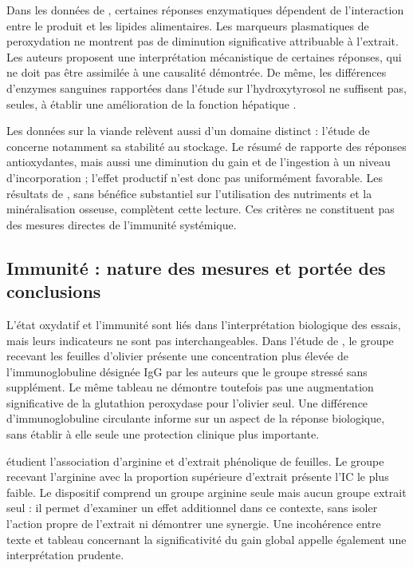 Dans les données de \citet{Sevillano2026}, certaines réponses enzymatiques dépendent de l'interaction entre le produit et les lipides alimentaires. Les marqueurs plasmatiques de peroxydation ne montrent pas de diminution significative attribuable à l'extrait. Les auteurs proposent une interprétation mécanistique de certaines réponses, qui ne doit pas être assimilée à une causalité démontrée. De même, les différences d'enzymes sanguines rapportées dans l'étude sur l'hydroxytyrosol ne suffisent pas, seules, à établir une amélioration de la fonction hépatique \citep{Dias2024Performance}.

Les données sur la viande relèvent aussi d'un domaine distinct : l'étude de \citet{Sarica2018} concerne notamment sa stabilité au stockage. Le résumé de \citet{Xie2022} rapporte des réponses antioxydantes, mais aussi une diminution du gain et de l'ingestion à un niveau d'incorporation ; l'effet productif n'est donc pas uniformément favorable. Les résultats de \citet{Leskovec2018}, sans bénéfice substantiel sur l'utilisation des nutriments et la minéralisation osseuse, complètent cette lecture. Ces critères ne constituent pas des mesures directes de l'immunité systémique.

\subsection{Immunité : nature des mesures et portée des conclusions}

L'état oxydatif et l'immunité sont liés dans l'interprétation biologique des essais, mais leurs indicateurs ne sont pas interchangeables. Dans l'étude de \citet{Mahasneh2024}, le groupe recevant les feuilles d'olivier présente une concentration plus élevée de l'immunoglobuline désignée IgG par les auteurs que le groupe stressé sans supplément. Le même tableau ne démontre toutefois pas une augmentation significative de la glutathion peroxydase pour l'olivier seul. Une différence d'immunoglobuline circulante informe sur un aspect de la réponse biologique, sans établir à elle seule une protection clinique plus importante.

\citet{Alfifi2025} étudient l'association d'arginine et d'extrait phénolique de feuilles. Le groupe recevant l'arginine avec la proportion supérieure d'extrait présente l'IC le plus faible. Le dispositif comprend un groupe arginine seule mais aucun groupe extrait seul : il permet d'examiner un effet additionnel dans ce contexte, sans isoler l'action propre de l'extrait ni démontrer une synergie. Une incohérence entre texte et tableau concernant la significativité du gain global appelle également une interprétation prudente.


